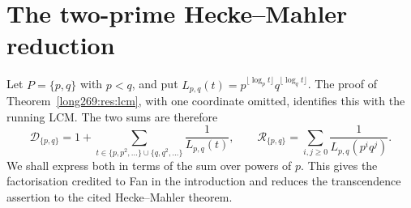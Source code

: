 \documentclass[11pt]{article}
\theoremstyle{remark}
\theoremstyle{plain}
\begin{document}
\section{The two-prime Hecke--Mahler reduction}
\label{long269:sec:two-prime}

Let $P=\{p,q\}$ with $p<q$, and put
$L_{p,q}(t)=p^{\lfloor\log_p t\rfloor}q^{\lfloor\log_q t\rfloor}$.
The proof of Theorem~\ref{long269:res:lcm}, with one coordinate omitted,
identifies this with the running LCM. The two sums are therefore
\[
 \mathcal D_{\{p,q\}}
 =1+\sum_{t\in\{p,p^2,\ldots\}\cup\{q,q^2,\ldots\}}\frac1{L_{p,q}(t)},
 \qquad
 \mathcal R_{\{p,q\}}=\sum_{i,j\ge0}\frac1{L_{p,q}(p^iq^j)}.
\]
We shall express both in terms of the sum over powers of $p$. This gives
the factorisation credited to Fan in the introduction and reduces the
transcendence assertion to the cited Hecke--Mahler theorem.
\end{document}
